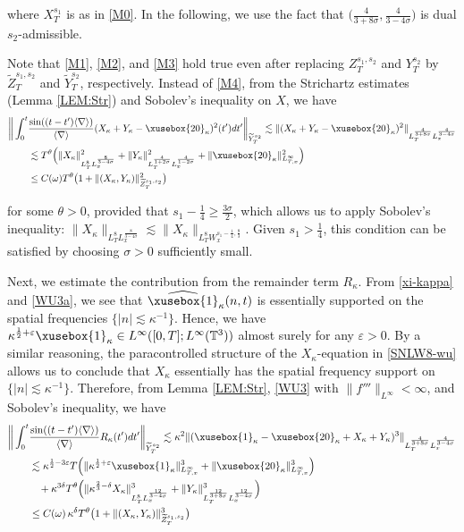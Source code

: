 \documentclass[%
11pt,  reqno]{amsart}
\def\<#1>{\xusebox{#1}}
\newcommand{\1}{\hspace{0.2mm}\text{I}\hspace{0.2mm}}
\newcommand{\noi}{\noindent}
\newcommand{\T}{\mathbb{T}}
\newcommand{\dl}{\delta}
\newcommand{\nb}{\nabla}
\newcommand{\eps}{\varepsilon}
\newcommand{\kk}{\kappa}
\newcommand{\s}{\sigma}
\newcommand{\ft}{\widehat}
\newcommand{\wt}{\widetilde}
\newcommand{\ta}{\theta}
\renewcommand{\o}{\omega}
\newcommand{\les}{\lesssim}
\newcommand{\jb}[1]
{\langle #1 \rangle}
\numberwithin{equation}{section}
\numberwithin{theorem}{section}
\begin{document}
\noi
where $X^{s_1}_T$ is as in \eqref{M0}.
In the following, we use the fact that 
$\big(\frac{4}{3+8\s}, \frac{4}{3-4\s}\big)$
is dual $s_2$-admissible.


Note that \eqref{M1}, \eqref{M2}, and \eqref{M3}
hold 
true even after replacing 
$Z^{s_1, s_2}_T$ and  $Y^{s_2}_T$
by $\wt Z^{s_1, s_2}_T$ and $\wt Y^{s_2}_T$, respectively.
Instead of \eqref{M4}, 
from the Strichartz estimates (Lemma \ref{LEM:Str})
and Sobolev's inequality on $X$, 
we have
\begin{align}
\bigg\| \int_0^t &  \frac{\sin((t-t')\jb{\nb})}{\jb{\nb}} 
 (X_\kk+Y_\kk-\<20>_\kk)^2(t') dt'\bigg\|_{\wt Y^{s_2}_T}
 \les \| (X_\kk+Y_\kk-\<20>_\kk)^2\|_{L^\frac{4}{3+8\s}_{T} L^\frac{4}{3-4\s}_x}\notag\\
& \les T^\ta 
\Big(\| X_\kk\|_{L^8_T L^\frac{8}{3-4\s}_x}^2
+ \| Y_\kk\|_{L^\frac{4}{1+2\s}_T L^\frac{4}{1-2\s}_x}^2
+ \| \<20>_\kk\|_{L^\infty_{T, x}}^2\Big)\notag\\
& \le C(\o) T^\ta \big( 1 + \|(X_\kk, Y_\kk)\|_{\wt Z^{s_1, s_2}_T}^2 \big)
\label{WU11}
\end{align}

\noi
for some $\ta > 0$, provided that $s_1 - \frac 1 4  \geq \frac{3\s}{2}$,
 which allows us to apply   Sobolev's inequality:
$
\|  X_\kk\|_{L^8_T L^\frac{8}{3-4\s}_x}  \les
\|  X_\kk\|_{L^8_T W^{s_1-\frac14, \frac83 }_x}
$.
Given $s_1 > \frac 14$, this condition can be satisfied by choosing $\s > 0$ sufficiently small.


Next, we estimate the contribution from  the remainder term $R_\kk$.
From \eqref{xi-kappa} and \eqref{WU3a}, 
we see that
 $\ft{\<1>}_\kk(n, t)$  is essentially supported on the spatial frequencies $\{|n|\les \kk^{-1}\}$.
Hence, we have 
$ \kk^{\frac{1}{2}+\eps}\<1>_\kk\in L^\infty([0, T]; L^\infty(\T^3))$
almost surely for any $\eps > 0$.
By a similar reasoning, 
the paracontrolled structure of the $X_\kk$-equation in \eqref{SNLW8-wu}
allows us to conclude that $X_\kk$
essentially has the spatial frequency support on $\{|n|\les \kk^{-1}\}$.
Therefore, 
from Lemma \ref{LEM:Str}, \eqref{WU3} with $\|f'''\|_{L^\infty} < \infty$, 
and Sobolev's inequality, 
we have
\begin{align}
\begin{split}
\bigg\| \int_0^t 
& \frac{\sin((t-t')\jb{\nb})}{\jb{\nb}} 
R_\kk(t') dt'
\bigg\|_{\wt Y^{s_2}_T}
  \les \kk^2\| ( \<1>_\kk - \<20>_\kk + X_\kk + Y_\kk)^3\|_{L^\frac{4}{3+8\s}_{T} L^\frac{4}{3-4\s}_x}\\
& 
\les 
\kk^{\frac{1}{2}-3\eps}T \Big( \| \kk^{\frac{1}{2}+\eps}\<1>_\kk\|^3_{L^\infty_{T, x}}
+ \| \<20>_\kk\|^3_{L^\infty_{T, x}} \Big)\\
& \hphantom{X}
+  \kk^{3\dl} T^\ta\Big( \| \kk^{\frac{2}{3}-\dl} X_\kk\|^3_{L^8_T L^\frac{12}{3-4\s}_x}
+  \| Y_\kk\|^3_{L^\frac{12}{3+8\s}_T L^\frac{12}{3-4\s}_x}\Big)\\
& \le C(\o) \, \kk^{\dl} T^\ta \big( 1 + \|(X_\kk, Y_\kk)\|_{\wt Z^{s_1, s_2}_T}^3 \big)
\end{split}
\label{WU12}
\end{align}
\end{document}
